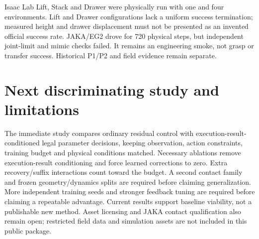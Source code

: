 \documentclass[10pt,a4paper]{article}
\begin{document}
Isaac Lab Lift, Stack and Drawer were physically run with one and four
environments. Lift and Drawer configurations lack a uniform success termination;
measured height and drawer displacement must not be presented as an invented
official success rate. JAKA/EG2 drove for 720 physical steps, but independent
joint-limit and mimic checks failed. It remains an engineering smoke, not grasp
or transfer success. Historical P1/P2 and field evidence remain separate.

\section{Next discriminating study and limitations}
The immediate study compares ordinary residual control with execution-result-
conditioned legal parameter decisions, keeping observation, action constraints,
training budget and physical conditions matched. Necessary ablations remove
execution-result conditioning and force learned corrections to zero. Extra
recovery/suffix interactions count toward the budget. A second contact family
and frozen geometry/dynamics splits are required before claiming generalization.
More independent training seeds and stronger feedback tuning are required before
claiming a repeatable advantage. Current results support baseline viability,
not a publishable new method. Asset licensing and JAKA contact qualification
also remain open; restricted field data and simulation assets are not included
in this public package.
\end{document}
